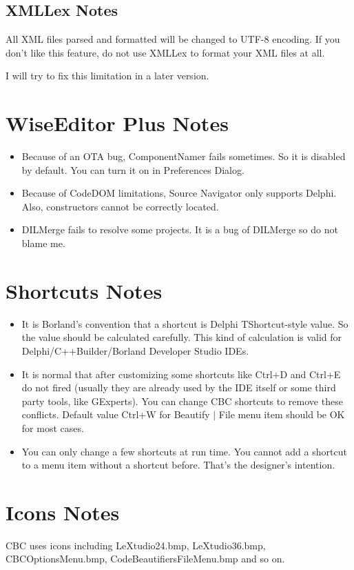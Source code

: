 \section{XMLLex Notes}
All XML files parsed and formatted will be changed to UTF-8 encoding. If you
don't like this feature, do not use XMLLex to format your XML files at all.

I will try to fix this limitation in a later version.

\chapter{WiseEditor Plus Notes}
\begin{itemize}
  \item Because of an OTA bug, ComponentNamer fails sometimes. So it is disabled by
default. You can turn it on in Preferences Dialog.
  \item Because of CodeDOM limitations, Source Navigator only supports Delphi. 
  Also, constructors cannot be correctly located.
  \item DILMerge fails to resolve some projects. It is a bug of DILMerge so do
  not blame me.
\end{itemize}

\chapter{Shortcuts Notes}
\begin{itemize}
  \item It is Borland's convention that a shortcut is Delphi TShortcut-style
  value. So the value should be calculated carefully. This kind of calculation
  is valid for Delphi/C++Builder/Borland Developer Studio IDEs.
  \item It is normal that after customizing some shortcuts like Ctrl+D and
  Ctrl+E do not fired (usually they are already used by the IDE itself or some
  third party tools, like GExperts). You can change CBC shortcuts to remove
  these conflicts. Default value Ctrl+W for Beautify $|$ File menu item should
  be OK for most cases.
  \item You can only change a few shortcuts at run time. You cannot add a
  shortcut to a menu item without a shortcut before. That's the designer's
  intention.
\end{itemize}

\chapter{Icons Notes}
CBC uses icons including LeXtudio24.bmp, LeXtudio36.bmp, CBCOptionsMenu.bmp,
CodeBeautifiersFileMenu.bmp and so on.

